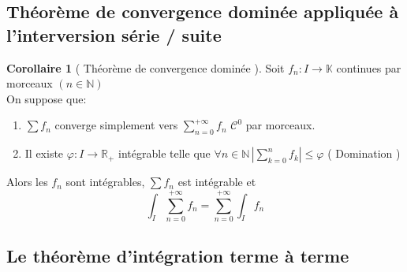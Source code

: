 \documentclass[10pt,a4paper]{article}
\theoremstyle{definition}
\newtheorem{corollary}[proposition]{Corollaire}
\begin{document}
\subsection{Théorème de convergence dominée appliquée à l'interversion série / suite}
\begin{corollary}[ Théorème de convergence dominée ]
    Soit \(f_n: I \to \mathbb{K}\) continues par morceaux \((n \in \mathbb{N})\) \\
    On suppose que:
    \begin{enumerate}
        \item \(\sum f_n\) converge simplement vers \(\sum\limits_{n = 0}^{+\infty} f_n\) \(\mathcal{C}^0\) par morceaux.
        \item Il existe \(\varphi: I \to \mathbb{R}_+\) intégrable telle que \(\forall n \in \mathbb{N}\, \left| \sum\limits_{k = 0}^{n} f_k \right| \leq \varphi\) ( Domination )
    \end{enumerate}
    Alors les \(f_n\) sont intégrables, \(\sum f_n\) est intégrable et
    \[\boxed{\int_{I} \sum_{n = 0}^{+\infty} f_n = \sum_{n = 0}^{+\infty}\int_{I} f_n}\]
\end{corollary}

\subsection{Le théorème d'intégration terme à terme}
\end{document}
